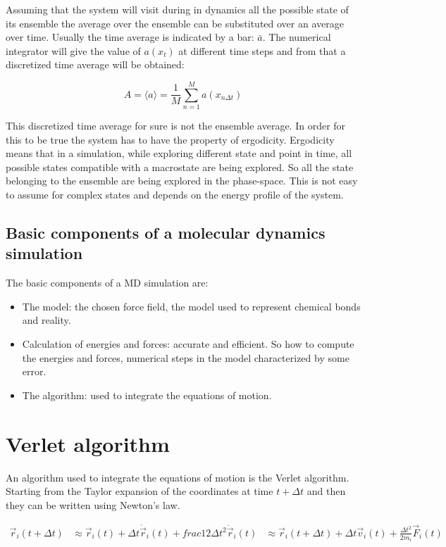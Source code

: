 	Assuming that the system will visit during in dynamics all the possible state of its ensemble the average over the ensemble can be substituted over an average over time.
	Usually the time average is indicated by a bar: $\bar{a}$.
	The numerical integrator will give the value of $a(x_t)$ at different time steps and from that a discretized time average will be obtained:

	$$A = \langle a\rangle = \frac{1}{M}\sum\limits_{n=1}^M a(x_{n\Delta t})$$

	This discretized time average for sure is not the ensemble average.
	In order for this to be true the system has to have the property of ergodicity.
	Ergodicity means that in a simulation, while exploring different state and point in time, all possible states compatible with a macrostate are being explored.
	So all the state belonging to the ensemble are being explored in the phase-space.
	This is not easy to assume for complex states and depends on the energy profile of the system.

	\subsection{Basic components of a molecular dynamics simulation}
	The basic components of a MD simulation are:

	\begin{multicols}{2}
		\begin{itemize}
			\item The model: the chosen force field, the model used to represent chemical bonds and reality.
			\item Calculation of energies and forces: accurate and efficient.
				So how to compute the energies and forces, numerical steps in the model characterized by some error.
			\item The algorithm: used to integrate the equations of motion.

		\end{itemize}
	\end{multicols}

\section{Verlet algorithm}
An algorithm used to integrate the equations of motion is the Verlet algorithm.
Starting from the Taylor expansion of the coordinates at time $t+\Delta t$ and then they can be written using Newton's law.

\begin{align*}
	\vec{r}_i(t+\Delta t)&\approx \vec{r}_i(t) + \Delta t\dot{\vec{r}}_i(t) + frac{1}{2}\Delta t^2\ddot{\vec{r}}_i(t)
											 &\approx\vec{r}_i(t+\Delta t)+\Delta t\vec{v}_i(t)+\frac{\Delta t^2}{2m_i}\vec{F}_i(t) \\
\end{align*}

